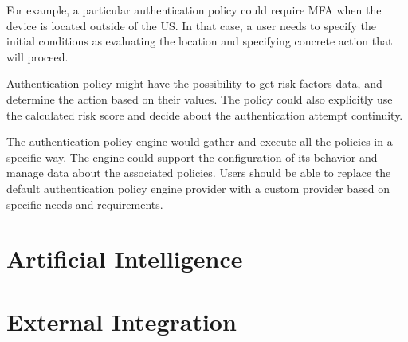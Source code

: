 For example, a particular authentication policy could require MFA when the device is located outside of the US.
In that case, a user needs to specify the initial conditions as evaluating the location and specifying concrete action that will proceed.

Authentication policy might have the possibility to get risk factors data, and determine the action based on their values.
The policy could also explicitly use the calculated risk score and decide about the authentication attempt continuity.

The authentication policy engine would gather and execute all the policies in a specific way.
The engine could support the configuration of its behavior and manage data about the associated policies.
Users should be able to replace the default authentication policy engine provider with a custom provider based on specific needs and requirements.

\section{Artificial Intelligence}

\section{External Integration}